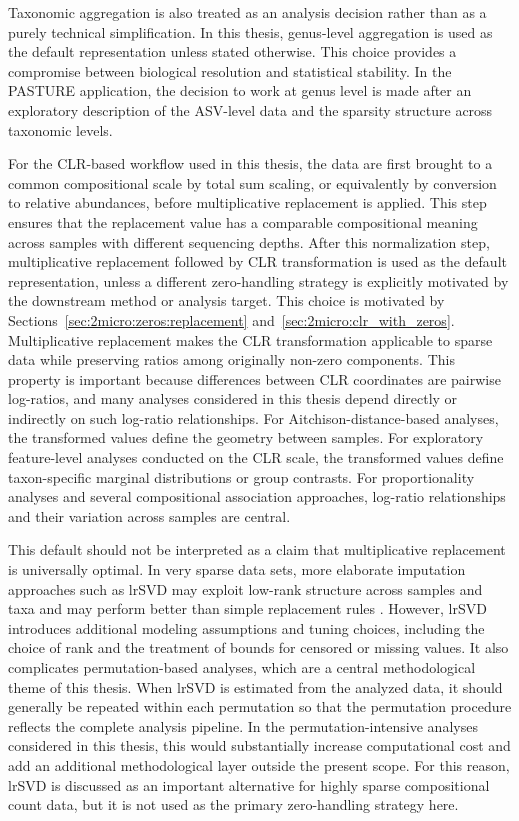 Taxonomic aggregation is also treated as an analysis decision rather than as a purely technical simplification. In this thesis, genus-level aggregation is used as the default representation unless stated otherwise. This choice provides a compromise between biological resolution and statistical stability. In the PASTURE application, the decision to work at genus level is made after an exploratory description of the ASV-level data and the sparsity structure across taxonomic levels.

For the CLR-based workflow used in this thesis, the data are first brought to a common compositional scale by total sum scaling, or equivalently by conversion to relative abundances, before multiplicative replacement is applied. This step ensures that the replacement value has a comparable compositional meaning across samples with different sequencing depths. After this normalization step, multiplicative replacement followed by CLR transformation is used as the default representation, unless a different zero-handling strategy is explicitly motivated by the downstream method or analysis target. This choice is motivated by Sections~\ref{sec:2micro:zeros:replacement} and~\ref{sec:2micro:clr_with_zeros}. Multiplicative replacement makes the CLR transformation applicable to sparse data while preserving ratios among originally non-zero components. This property is important because differences between CLR coordinates are pairwise log-ratios, and many analyses considered in this thesis depend directly or indirectly on such log-ratio relationships. For Aitchison-distance-based analyses, the transformed values define the geometry between samples. For exploratory feature-level analyses conducted on the CLR scale, the transformed values define taxon-specific marginal distributions or group contrasts. For proportionality analyses and several compositional association approaches, log-ratio relationships and their variation across samples are central.

This default should not be interpreted as a claim that multiplicative replacement is universally optimal. In very sparse data sets, more elaborate imputation approaches such as lrSVD may exploit low-rank structure across samples and taxa and may perform better than simple replacement rules \citep{tang2026critical}. However, lrSVD introduces additional modeling assumptions and tuning choices, including the choice of rank and the treatment of bounds for censored or missing values. It also complicates permutation-based analyses, which are a central methodological theme of this thesis. When lrSVD is estimated from the analyzed data, it should generally be repeated within each permutation so that the permutation procedure reflects the complete analysis pipeline. In the permutation-intensive analyses considered in this thesis, this would substantially increase computational cost and add an additional methodological layer outside the present scope. For this reason, lrSVD is discussed as an important alternative for highly sparse compositional count data, but it is not used as the primary zero-handling strategy here.

